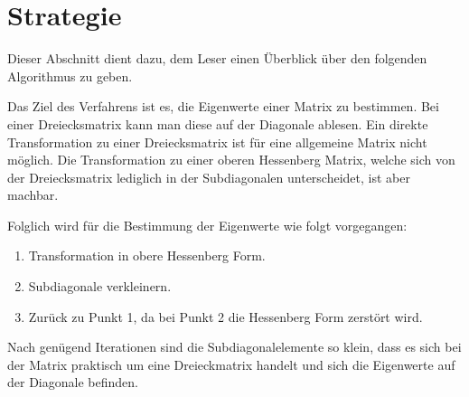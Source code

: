\section{Strategie\label{francis:section:strategie}}
Dieser Abschnitt dient dazu, dem Leser einen Überblick über den folgenden Algorithmus zu geben.

Das Ziel des Verfahrens ist es, die Eigenwerte einer Matrix zu bestimmen.
Bei einer Dreiecksmatrix kann man diese auf der Diagonale ablesen.
Ein direkte Transformation zu einer Dreiecksmatrix ist für eine allgemeine Matrix nicht möglich.
Die Transformation zu einer oberen Hessenberg Matrix, welche sich von der Dreiecksmatrix lediglich in der Subdiagonalen unterscheidet, ist aber machbar.

Folglich wird für die Bestimmung der Eigenwerte wie folgt vorgegangen:
\begin{enumerate}
	\item Transformation in obere Hessenberg Form.
	\item Subdiagonale verkleinern.
	\item Zurück zu Punkt 1, da bei Punkt 2 die Hessenberg Form zerstört wird.
\end{enumerate}
Nach genügend Iterationen sind die Subdiagonalelemente so klein, dass es sich bei der Matrix praktisch um eine Dreieckmatrix handelt und sich die Eigenwerte auf der Diagonale befinden.

